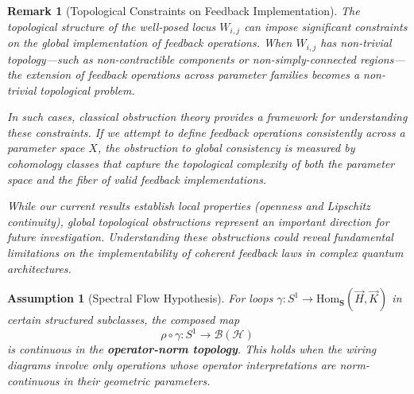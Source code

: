 \documentclass[11pt]{article}
\newtheorem{assumption}{Assumption}
\newtheorem{remark}{Remark}
\begin{document}
\begin{remark}[Topological Constraints on Feedback Implementation]\label{rem:topological-constraints}
The topological structure of the well-posed locus $W_{i,j}$ can impose significant constraints on the global implementation of feedback operations. When $W_{i,j}$ has non-trivial topology—such as non-contractible components or non-simply-connected regions—the extension of feedback operations across parameter families becomes a non-trivial topological problem.

In such cases, classical obstruction theory provides a framework for understanding these constraints. If we attempt to define feedback operations consistently across a parameter space $X$, the obstruction to global consistency is measured by cohomology classes that capture the topological complexity of both the parameter space and the fiber of valid feedback implementations.

While our current results establish local properties (openness and Lipschitz continuity), global topological obstructions represent an important direction for future investigation. Understanding these obstructions could reveal fundamental limitations on the implementability of coherent feedback laws in complex quantum architectures.
\end{remark}


\begin{assumption}[Spectral Flow Hypothesis]\label{assump:spectral-flow}
For loops $\gamma: S^1 \to \mathrm{Hom}_{\mathbf{S}}(\vec{H}, \vec{K})$ in certain structured subclasses, the composed map 
\[
\rho \circ \gamma: S^1 \to \mathcal{B}(\mathcal{H})
\]
is continuous in the \textbf{operator-norm topology}. This holds when the wiring diagrams involve only operations whose operator interpretations are norm-continuous in their geometric parameters.
\end{assumption}
\end{document}
